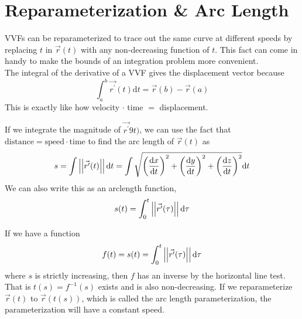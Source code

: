\section{Reparameterization \& Arc Length}
\noindent
VVFs can be reparameterized to trace out the same curve at different speeds by replacing $t$ in $\vec{r}(t)$ with any non-decreasing function of $t$. This fact can come in handy to make the bounds of an integration problem more convenient.\\

\noindent
The integral of the derivative of a VVF gives the displacement vector because
\begin{equation*}
	\int_{a}^{b}{\vec{r^\prime}(t)\mathrm{d}t}=\vec{r}(b)-\vec{r}(a)
\end{equation*}
This is exactly like how velocity $\cdot$ time $=$ displacement.

\noindent
If we integrate the magnitude of $\vec{r^\prime}9t)$, we can use the fact that $\text{distance} = \text{speed}\cdot\text{time}$ to find the arc length of $\vec{r}(t)$ as
\begin{equation*}
	s=\int{\left|\left|\vec{r^\prime}(t)\right|\right|\mathrm{d}t}=\int{\sqrt{\left(\frac{\mathrm{d}x}{\mathrm{d}t}\right)^2+\left(\frac{\mathrm{d}y}{\mathrm{d}t}\right)^2+\left(\frac{\mathrm{d}z}{\mathrm{d}t}\right)^2}\mathrm{d}t}
\end{equation*}
We can also write this as an arclength function,
\begin{equation*}
	s(t)=\int_{0}^{t}{\left|\left|\vec{r^{\prime}}(\tau)\right|\right|\mathrm{d}\tau}
\end{equation*}

\noindent
If we have a function
\begin{equation*}
	f(t)=s(t)=\int_{0}^{t}{\left|\left|\vec{r^{\prime}}(\tau)\right|\right|\mathrm{d}\tau}
\end{equation*}
where $s$ is strictly increasing, then $f$ has an inverse by the horizontal line test. That is $t(s) = f^{-1}(s)$ exists and is also non-decreasing. If we reparameterize $\vec{r}(t)$ to $\vec{r}(t(s))$, which is called the arc length parameterization, the parameterization will have a constant speed.